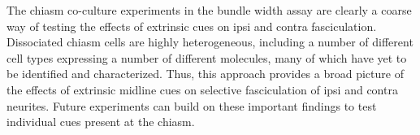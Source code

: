 The chiasm co-culture experiments in the bundle width assay are clearly a coarse way of testing the effects of extrinsic cues on ipsi and contra fasciculation.
Dissociated chiasm cells are highly heterogeneous, including a number of different cell types expressing a number of different molecules, many of which have yet to be identified and characterized.
Thus, this approach provides a broad picture of the effects of extrinsic midline cues on selective fasciculation of ipsi and contra neurites.
Future experiments can build on these important findings to test individual cues present at the chiasm.